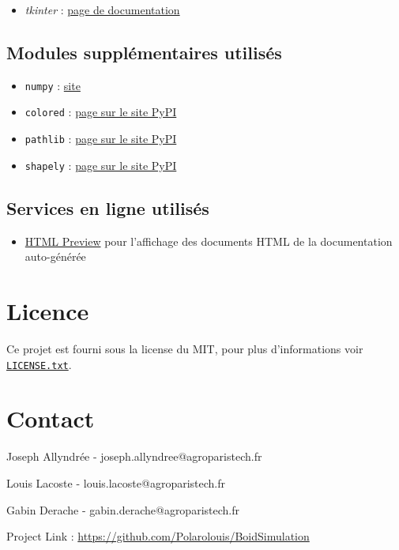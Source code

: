 \documentclass[
]{article}
\providecommand{\tightlist}{%
  \setlength{\itemsep}{0pt}\setlength{\parskip}{0pt}}
\begin{document}
\begin{itemize}
\tightlist
\item
  \emph{tkinter} :
  \href{https://docs.python.org/fr/3/library/tk.html}{page de
  documentation}
\end{itemize}

\hypertarget{modules-suppluxe9mentaires-utilisuxe9s}{%
\subsection{Modules supplémentaires
utilisés}\label{modules-suppluxe9mentaires-utilisuxe9s}}

\begin{itemize}
\tightlist
\item
  \texttt{numpy} : \href{https://numpy.org/}{site}
\item
  \texttt{colored} : \href{https://pypi.org/project/colored/}{page sur
  le site PyPI}
\item
  \texttt{pathlib} : \href{https://pypi.org/project/pathlib/}{page sur
  le site PyPI}
\item
  \texttt{shapely} : \href{https://pypi.org/project/Shapely/}{page sur
  le site PyPI}
\end{itemize}

\hypertarget{services-en-ligne-utilisuxe9s}{%
\subsection{Services en ligne
utilisés}\label{services-en-ligne-utilisuxe9s}}

\begin{itemize}
\tightlist
\item
  \href{https://htmlpreview.github.io/}{HTML Preview} pour l'affichage
  des documents HTML de la documentation auto-générée
\end{itemize}

\hypertarget{licence}{%
\section{Licence}\label{licence}}

Ce projet est fourni sous la license du MIT, pour plus d'informations
voir
\href{https://github.com/Polarolouis/BoidSimulation/raw/main/LICENSE.txt}{\texttt{LICENSE.txt}}.

\hypertarget{contact}{%
\section{Contact}\label{contact}}

Joseph Allyndrée - joseph.allyndree@agroparistech.fr

Louis Lacoste - louis.lacoste@agroparistech.fr

Gabin Derache - gabin.derache@agroparistech.fr

Project Link : \url{https://github.com/Polarolouis/BoidSimulation}
\end{document}
